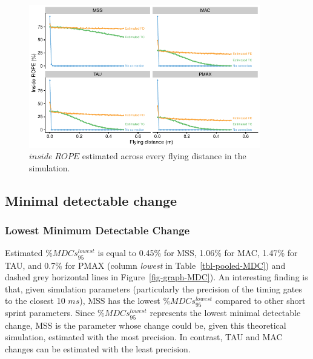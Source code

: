 \documentclass[
  letterpaper,
  DIV=11,
  numbers=noendperiod]{scrartcl}
\begin{document}
\begin{figure}

{\centering \includegraphics[width=0.9\textwidth,height=\textheight]{shorts-simulation-paper_files/figure-pdf/fig-graph-inside-ROPE-1.pdf}

}

\caption{\label{fig-graph-inside-ROPE}\(inside \; ROPE\) estimated
across every flying distance in the simulation.}

\end{figure}

\hypertarget{minimal-detectable-change}{%
\subsection{Minimal detectable change}\label{minimal-detectable-change}}

\hypertarget{lowest-minimum-detectable-change}{%
\subsubsection{Lowest Minimum Detectable
Change}\label{lowest-minimum-detectable-change}}

Estimated \(\%MDCs_{95}^{lowest}\) is equal to 0.45\% for MSS, 1.06\%
for MAC, 1.47\% for TAU, and 0.7\% for PMAX (column \emph{lowest} in
Table~\ref{tbl-pooled-MDC}) and dashed grey horizontal lines in
Figure~\ref{fig-graph-MDC}). An interesting finding is that, given
simulation parameters (particularly the precision of the timing gates to
the closest 10 \(ms\)), MSS has the lowest \(\%MDCs_{95}^{lowest}\)
compared to other short sprint parameters. Since
\(\%MDCs_{95}^{lowest}\) represents the lowest minimal detectable
change, MSS is the parameter whose change could be, given this
theoretical simulation, estimated with the most precision. In contrast,
TAU and MAC changes can be estimated with the least precision.
\end{document}

